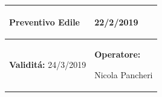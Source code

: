 \documentclass[a4paper]{article}
\begin{document}
                                  \begin{center}
                                  \begin{tabular}{|L{89mm} R{60mm}| }
                                  \hline
                                  \vspace{2.5mm}
                                  \begin{spacing}{0}
                                \textbf{Preventivo Edile}
                                  \end{spacing}&
                                  \vspace{2.5mm}
                                  \begin{spacing}{0}

                                22/2/2019

                                  \end{spacing}\\
                                  \hline
                                  \vspace{2.5mm}
                                  \begin{spacing}{0}

                                
                                        \textbf{Validit\'a:}
                                   24/3/2019
                                  \end{spacing} &
                                  \vspace{2.5mm}
                                  \begin{spacing}{0}
                                    \textbf{Operatore:}

                               Nicola Pancheri
                                  \end{spacing} \\
                                  \hline
                                  \end{tabular}
                                  \end{center}
                               
\end{document}
